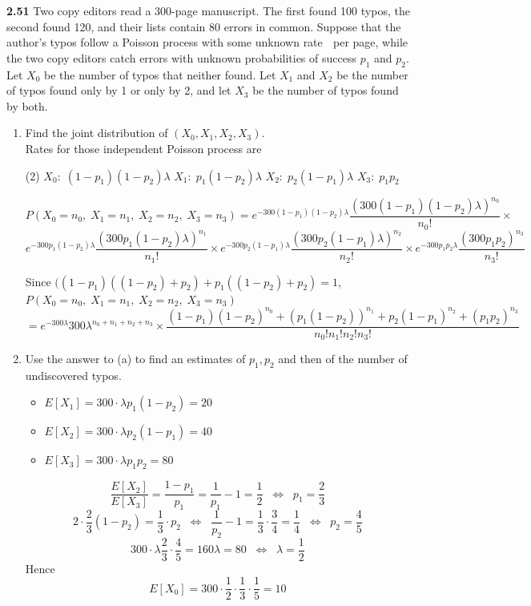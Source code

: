 \documentclass[12pt]{article}
\begin{document}
\newpage
{\bf 2.51 }Two copy editors read a 300-page manuscript. The first found 100 typos, the second found 120, and their lists contain 80 errors in common. Suppose that the author’s typos follow a Poisson process with some unknown rate  per page, while the two copy editors catch errors with unknown probabilities of success $p_1$ and $p_2$. Let $X_0$ be the number of typos that neither found. Let $X_1$ and $X_2$ be the number of typos found only by 1 or only by 2, and let $X_3$ be the number of typos found by both.
\begin{enumerate}[label=(\alph*)]
    \item Find the joint distribution of $(X_0,X_1,X_2,X_3)$.\\
    
    Rates for those independent Poisson process are
    \begin{tasks}[label](2)
        \task $X_0:\; (1-p_1)(1-p_2)\lambda$
        \task $X_1:\; p_1(1-p_2)\lambda$
        \task $X_2:\; p_2(1-p_1)\lambda$
        \task $X_3:\; p_1p_2$
    \end{tasks}
    
    $$P(X_0=n_0,\;X_1=n_1,\;X_2=n_2,\;X_3=n_3)
    =e^{-300(1-p_1)(1-p_2)\lambda}\frac{(300(1-p_1)(1-p_2)\lambda)^{n_0}}{n_0!}\times$$
    $$
    e^{-300p_1(1-p_2)\lambda}\frac{(300p_1(1-p_2)\lambda)^{n_1}}{n_1!}\times e^{-300p_2(1-p_1)\lambda}\frac{(300p_2(1-p_1)\lambda)^{n_2}}{n_2!}\times
    e^{-300p_1p_2\lambda}\frac{(300p_1p_2)^{n_3}}{n_3!} 
    $$
    
    \vspace{1\baselineskip}
    Since $((1-p_1)((1-p_2)+p_2)+p_1((1-p_2)+p_2) = 1$,\\
    
    $P(X_0=n_0,\;X_1=n_1,\;X_2=n_2,\;X_3=n_3)$
    $$=e^{-300\lambda}
    300\lambda^{n_0+n_1+n_2+n_3}\times \frac{
    (1-p_1)(1-p_2)^{n_0}+(p_1(1-p_2))^{n_1} + p_2(1-p_1)^{n_2} + (p_1p_2)^{n_3}
    }{n_0!n_1!n_2!n_3!}$$
    \item Use the answer to (a) to find an estimates of $p_1,p_2$ and then of the number of undiscovered typos.
    
    \begin{itemize}[label={}]
        \item $E[X_1]=300\cdot \lambda p_1(1-p_2)=20$
        \item $E[X_2]=300\cdot \lambda p_2(1-p_1)=40$
        \item $E[X_3]=300\cdot \lambda p_1p_2=80$
    \end{itemize}
    $$\frac{E[X_2]}{E[X_3]} = \frac{1-p_1}{p_1} = \frac{1}{p_1}-1 = \frac{1}{2} \;\;\Leftrightarrow\;\;p_1 = \frac{2}{3}$$
    $$2\cdot \frac{2}{3}(1-p_2) = \frac{1}{3}\cdot p_2\;\;\Leftrightarrow\;\;
    \frac{1}{p_2} - 1 = \frac{1}{3}\cdot \frac{3}{4} = \frac{1}{4} \;\;\Leftrightarrow\;\;p_2=\frac{4}{5}$$
    $$300\cdot \lambda \frac{2}{3}\cdot \frac{4}{5} = 160\lambda = 80\;\;\Leftrightarrow\;\;\lambda = \frac{1}{2}$$
    Hence
    $$E[X_0] = 300\cdot \frac{1}{2}\cdot\frac{1}{3}\cdot \frac{1}{5} = 10$$
\end{enumerate}
\end{document}

